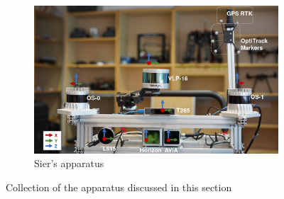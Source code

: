 \begin{figure}[H]
\begin{subfigure}{0.45\textwidth}
        \includegraphics[width=\linewidth]{images/background/sier_apparatus.png}
        \caption{Sier's apparatus \cite{sier_benchmark_2022}}
        \label{fig: sier apparatus}
    \end{subfigure}
    \caption{Collection of the apparatus discussed in this section}
    \label{fig: all apparatus}
\end{figure}